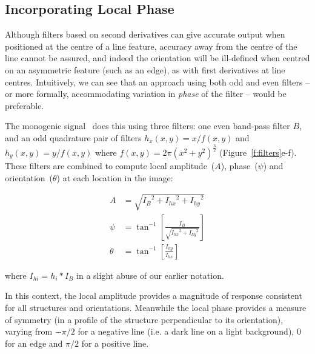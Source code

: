 \documentclass[runningheads,a4paper]{llncs}
\newcommand{\fref}[1]{Figure~\ref{#1}}
\newcommand{\comment}[1]{}
\begin{document}
\subsection{Incorporating Local Phase}
\label{s:phase_filters}
Although filters based on second derivatives can give accurate output when positioned at the centre of a line feature, accuracy away from the centre of the line cannot be assured, and indeed the orientation will be ill-defined when centred on an asymmetric feature (such as an edge), as with first derivatives at line centres. Intuitively, we can see that an approach using both odd and even filters -- or more formally, accommodating variation in \emph{phase} of the filter -- would be preferable.

\comment{This is where using both sine and cosine parts of the Gabor filters is useful. We can largely ignore this, however, on grounds that Gabor filters are very expensive to compute.}

\comment{If we need the space, I'd consider reducing this to a paragraph that states that the monogenic signal suffers the same problems as first derivatives, despite its use of phase.}
The monogenic signal~\cite{Felsberg_Sommer_TSP01} does this using three filters: one even band-pass filter $B$, and an odd quadrature pair of filters $h_x(x,y) = x/f(x,y)$ and $h_y(x,y) = y/f(x,y)$ where $f(x,y) = 2\pi(x^2 + y^2)^{\frac{3}{2}}$ (\fref{f:filters}e-f). These filters are combined to compute local amplitude~($A$), phase~($\psi$) and orientation~($\theta$) at each location in the image:

\begin{align}
A       &= \sqrt{{I_B}^2 + {I_{hx}}^2 + {I_{hy}}^2} \label{e:ma} \\
\psi	  &= \tan^{-1}\left[ \frac{I_B}{\sqrt{{I_{hx}}^2 + {I_{hy}}^2}} \right] \label{e:mp} \\
\theta  &= \tan^{-1}\left[ \frac{I_{hy}}{I_{hx}} \right] \label{e:mt}
\end{align}

\noindent where $I_{hi} = h_i \ast I_B$ in a slight abuse of our earlier notation.
\comment{define Ib, Ihx and Ihy}

In this context, the local amplitude provides a magnitude of response consistent for all structures and orientations. Meanwhile the local phase provides a measure of symmetry (in a profile of the structure perpendicular to its orientation), varying from $-\pi/2$ for a negative line (i.e. a dark line on a light background), $0$ for an edge and $\pi/2$ for a positive line.
\end{document}
